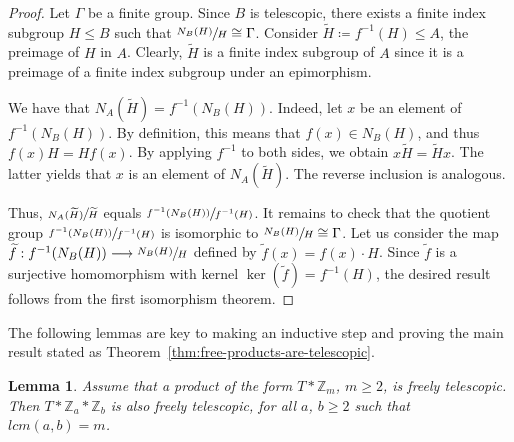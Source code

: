 \documentclass[10pt,a4paper]{amsart}
\newtheorem{lemm}[theo]{Lemma}
\theoremstyle{definition}
\newcommand{\ZZ}{\mathbb{Z}}
\begin{document}
\begin{proof}
Let $\Gamma$ be a finite group. Since $B$ is telescopic, there exists a finite index subgroup $H \leq B$ such that $\sfrac{N_B (H)}{H} \cong \Gamma$. Consider $ \widetilde{H}\coloneqq f^{-1}(H) \leq A$, the preimage of $H$ in $A$. Clearly, $\widetilde{H}$ is a finite index subgroup of $A$ since it is a preimage of a finite index subgroup under an epimorphism.

We have that $ N_A(\widetilde{H})=f^{-1}(N_B(H))$. Indeed, let $x$ be an element of $f^{-1}(N_B(H))$. By definition, this means that $f(x) \in N_B (H)$, and thus $f(x) H = H f(x)$. By applying $f^{-1}$ to both sides, we obtain $x \widetilde{H} = \widetilde{H} x$. The latter yields that $x$ is an element of $N_A(\widetilde{H})$. The reverse inclusion is analogous. 

Thus, $\sfrac{N_A (\widetilde{H})}{\widetilde{H}}$ equals $ \sfrac{f^{-1}(N_B(H))}{f^{-1}(H)}$. It remains to check that the quotient group $ \sfrac{f^{-1}(N_B(H))}{f^{-1}(H)}$ is isomorphic to $\sfrac{N_B(H)}{H} \cong \Gamma$. Let us consider the map $\widetilde{f} : f^{-1}(N_{B}(H)) \longrightarrow \sfrac{N_B(H)}{H}$ defined by $\widetilde{f}(x) = f(x) \cdot H$. Since $\widetilde{f}$ is a surjective homomorphism with kernel $\ker(\widetilde{f})=f^{-1}(H)$, the desired result follows from the first isomorphism theorem.
\end{proof}

The following lemmas are key to making an inductive step and proving the main result stated as Theorem~\ref{thm:free-products-are-telescopic}.

\begin{lemm}\label{lemma:telescopic-lcm}
Assume that a product of the form $T*\ZZ_{m}$, $m \geq 2$, is freely telescopic. Then $T*\ZZ_a*\ZZ_b$ is also freely telescopic, for all $a$, $b\geq 2$ such that $lcm(a, b) = m$.
\end{lemm}
\end{document}
